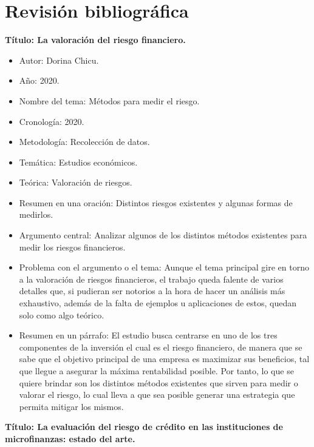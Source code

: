\documentclass[
  letterpaper,
  DIV=11,
  numbers=noendperiod]{scrreprt}
\begin{document}
\section{Revisión bibliográfica}\label{revisiuxf3n-bibliogruxe1fica}

\textbf{Título: La valoración del riesgo financiero.}

\begin{itemize}
\item
  Autor: Dorina Chicu.
\item
  Año: 2020.
\item
  Nombre del tema: Métodos para medir el riesgo.
\item
  Cronología: 2020.
\item
  Metodología: Recolección de datos.
\item
  Temática: Estudios económicos.
\item
  Teórica: Valoración de riesgos.
\item
  Resumen en una oración: Distintos riesgos existentes y algunas formas
  de medirlos.
\item
  Argumento central: Analizar algunos de los distintos métodos
  existentes para medir los riesgos financieros.
\item
  Problema con el argumento o el tema: Aunque el tema principal gire en
  torno a la valoración de riesgos financieros, el trabajo queda falente
  de varios detalles que, si pudieran ser notorios a la hora de hacer un
  análisis más exhaustivo, además de la falta de ejemplos u aplicaciones
  de estos, quedan solo como algo teórico.
\item
  Resumen en un párrafo: El estudio busca centrarse en uno de los tres
  componentes de la inversión el cual es el riesgo financiero, de manera
  que se sabe que el objetivo principal de una empresa es maximizar sus
  beneficios, tal que llegue a asegurar la máxima rentabilidad posible.
  Por tanto, lo que se quiere brindar son los distintos métodos
  existentes que sirven para medir o valorar el riesgo, lo cual lleva a
  que sea posible generar una estrategia que permita mitigar los mismos.
\end{itemize}

\textbf{Título: La evaluación del riesgo de crédito en las instituciones
de microfinanzas: estado del arte. }
\end{document}
